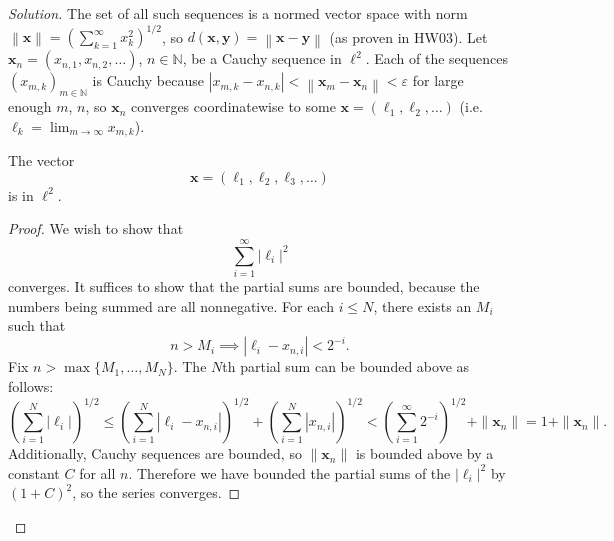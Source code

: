 \documentclass[10pt]{article}
\providecommand{\eps}{\varepsilon}
\providecommand{\NN}{\mathbb N}
\providecommand{\mb}[1]{\mathbf{#1}}
\newenvironment{soln}{\begin{proof}[Solution]}{\end{proof}}
\providecommand{\abs}[1]{\left\lvert #1\right\rvert}
\providecommand{\norm}[1]{\left\|#1\right\|}
\begin{document}
\begin{soln}
    The set of all such sequences is a normed vector space
    with norm $\norm{\mb x} = (\sum_{k=1}^\infty x_k^2)^{1/2}$,
    so $d(\mb x,\mb y) = \norm{\mb x-\mb y}$ (as proven in HW03).
    Let $\mb x_n = (x_{n,1}, x_{n,2}, \dots)$, $n\in\NN$,
    be a Cauchy sequence in $\ell^2$.
    Each of the sequences $(x_{m,k})_{m\in\NN}$ is Cauchy
    because $\abs{x_{m,k} - x_{n,k}} < \norm{\mb x_m - \mb x_n} < \eps$
    for large enough $m$, $n$, so $\mb x_n$ converges coordinatewise
    to some $\mb x = (\ell_1,\ell_2,\dots)$
    (i.e. $\ell_k = \lim_{m\to\infty} x_{m,k}$).


    \begin{claim}
	The vector
	\[\mb x = (\ell_1, \ell_2, \ell_3, \dots)\]
	is in $\ell^2$.
    \end{claim}
    \begin{proof}
	We wish to show that
	\[\sum_{i=1}^\infty |\ell_i|^2\]
	converges. It suffices to show that
	the partial sums are bounded, because the numbers being summed
	are all nonnegative.
	For each $i\le N$, there exists an $M_i$ such that
	\[n > M_i\implies |\ell_i - x_{n,i}| < 2^{-i}.\]
	Fix $n > \max\{M_1, \dots, M_N\}$.
	The $N$th partial sum can be bounded above as follows:
	\begin{equation*}
	    \left(\sum_{i=1}^N |\ell_i|\right)^{1/2}
	    \le \left(\sum_{i=1}^N |\ell_i - x_{n,i}|\right)^{1/2}
	    + \left(\sum_{i=1}^N |x_{n,i}|\right)^{1/2}
	    < \left(\sum_{i=1}^\infty 2^{-i}\right)^{1/2} + \|\mb x_n\|
	    = 1 + \|\mb x_n\|.
	\end{equation*}
	Additionally, Cauchy sequences are bounded,
	so $\|\mb x_n\|$ is bounded above by a constant $C$
	for all $n$. Therefore we have bounded the partial sums of the $|\ell_i|^2$
	by $(1 + C)^2$, so the series converges.
    \end{proof}


\end{soln}
\end{document}
